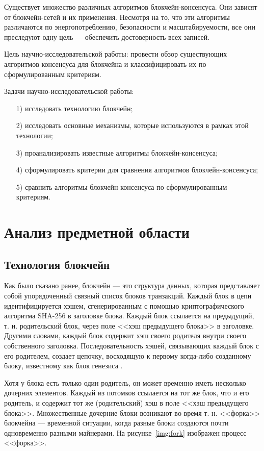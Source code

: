 \documentclass{bmstu}
\begin{document}
Существует множество различных алгоритмов блокчейн-консенсуса. 
Они зависят от блокчейн-сетей и их применения. 
Несмотря на то, что эти алгоритмы различаются по энергопотреблению, безопасности и масштабируемости, все они преследуют одну цель --- обеспечить достоверность всех записей.

Цель научно-исследовательской работы: провести обзор существующих алгоритмов консенсуса для блокчейна и классифицировать их по сформулированным критериям.

Задачи научно-исследовательской работы:

\begin{enumerate}
\item[1)]
исследовать технологию блокчейн;
\item[2)]
исследовать основные механизмы, которые используются в рамках этой технологии;
\item[3)]
проанализировать известные алгоритмы блокчейн-консенсуса;
\item[4)]
сформулировать критерии для сравнения алгоритмов блокчейн-консенсуса;
\item[5)]
сравнить алгоритмы блокчейн-консенсуса по сформулированным критериям.
\end{enumerate}

\chapter{Анализ предметной области}

\section{Технология блокчейн}

Как было сказано ранее, блокчейн --- это структура данных, которая представляет собой упорядоченный связный список блоков транзакций. 
Каждый блок в цепи идентифицируется хэшем, сгенерированным с помощью криптографического алгоритма SHA-256 в заголовке блока. 
Каждый блок ссылается на предыдущий, т. н. родительский блок, через поле <<хэш предыдущего блока>> в заголовке. 
Другими словами, каждый блок содержит хэш своего родителя внутри своего собственного заголовка. 
Последовательность хэшей, связывающих каждый блок с его родителем, создает цепочку, восходящую к первому когда-либо созданному блоку, известному как блок генезиса \cite[163]{Antonopoulos2010}.

Хотя у блока есть только один родитель, он может временно иметь несколько дочерних элементов. 
Каждый из потомков ссылается на тот же блок, что и его родитель, и содержит тот же (родительский) хэш в поле <<хэш предыдущего блока>>. 
Множественные дочерние блоки возникают во время т. н. <<форка>> блокчейна --- временной ситуации, когда разные блоки создаются почти одновременно разными майнерами. 
На рисунке~\ref{img:fork} изображен процесс <<форка>>.
\end{document}
